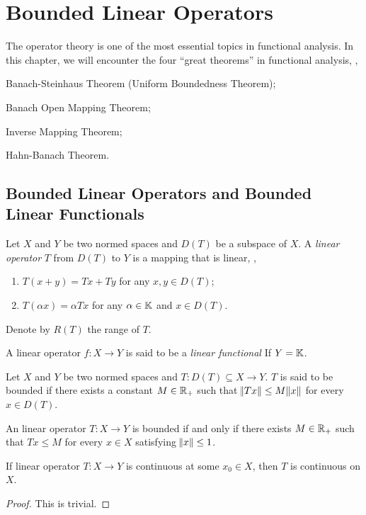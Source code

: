 \chapter{Bounded Linear Operators}
The operator theory is one of the most essential topics in functional 
analysis. 
In this chapter, we will encounter the four ``great theorems'' in 
functional analysis, \ie, 
\begin{enumerate*}
    \item Banach-Steinhaus Theorem (Uniform Boundedness Theorem); 
    \item Banach Open Mapping Theorem; 
    \item Inverse Mapping Theorem; 
    \item Hahn-Banach Theorem. 
\end{enumerate*}

\section{Bounded Linear Operators and Bounded Linear Functionals} 
\begin{defn}
Let $X$ and $Y$ be two normed spaces and $D(T)$ be a subspace of $X$. 
A \emph{linear operator} $T$ from $D(T)$ to $Y$ is a mapping that is linear, 
\ie, 
\begin{enumerate}
    \item $T(x + y) = Tx + Ty$ for any $x, y \in D(T)$; 
    \item $T(\alpha x) = \alpha Tx$ for any $\alpha \in \mathbb{K}$ and 
    $x \in D(T)$. 
\end{enumerate}
Denote by $R(T)$ the range of $T$. 

A linear operator $f: X \to Y$ is said to be a \emph{linear functional} 
If $Y = \mathbb{K}$. 
\end{defn}

\begin{defn}
Let $X$ and $Y$ be two normed spaces and $T: D(T) \subseteq X \to Y$. 
$T$ is said to be bounded if there exists a constant $M \in \mathbb{R}_+$ such that 
$\norm{Tx} \le M \norm{x}$ for every $x \in D(T)$. 
\end{defn}

An linear operator $T: X \to Y$ is bounded if and only if there exists $M 
\in \mathbb{R}_+$ such that $Tx \le M$ for every $x \in X$ satisfying $\norm{x} \le 
1$. 

\begin{prop}
If linear operator $T: X \to Y$ is continuous at some $x_0 \in X$, then $T$ 
is continuous on $X$. 
\end{prop}
\begin{proof}
This is trivial. 
\end{proof}

